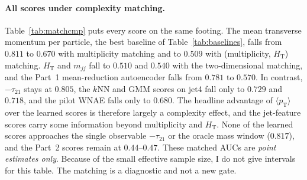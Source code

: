 \documentclass[11pt,a4paper]{article}
\newcommand{\pt}{\ensuremath{p_\mathrm{T}}\xspace}
\newcommand{\HT}{\ensuremath{H_\mathrm{T}}\xspace}
\newcommand{\mjj}{\ensuremath{m_{jj}}\xspace}
\newcommand{\tauTO}{\ensuremath{\tau_{21}}\xspace}
\newcommand{\ptmean}{\ensuremath{\langle \pt \rangle}\xspace}
\begin{document}
\paragraph{All scores under complexity matching.}
Table~\ref{tab:matchcmp} puts every score on the same footing. The mean transverse momentum per
particle, the best baseline of Table~\ref{tab:baselines}, falls from $0.811$ to $0.670$ with
multiplicity matching and to $0.509$ with (multiplicity, \HT) matching. \HT and \mjj fall to $0.510$
and $0.540$ with the two-dimensional matching, and the Part~1 mean-reduction autoencoder falls from
$0.781$ to $0.570$. In contrast, $-\tauTO$ stays at $0.805$, the $k$NN and GMM scores on jet4 fall only to
$0.729$ and $0.718$, and the pilot WNAE falls only to $0.680$. The headline advantage of \ptmean over the
learned scores is therefore largely a complexity effect, and the jet-feature scores carry some
information beyond multiplicity and \HT. None of the learned scores approaches the single
observable $-\tauTO$ or the oracle mass window ($0.817$), and the Part~2 scores remain at $0.44$--$0.47$.
These matched AUCs are \emph{point estimates only}. Because of the small effective sample size, I
do not give intervals for this table. The matching is a diagnostic and not a new gate.
\end{document}
